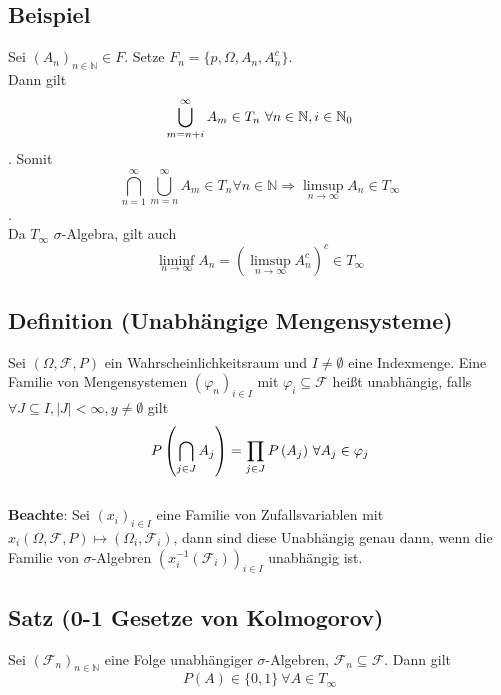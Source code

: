 \documentclass[german,10pt,oneside, fleqn, a4paper]{article}
\newcommand {\N}	{\mathbb{N}}
\newcommand{\brc}[1]{\left(#1\right)}
\newcommand{\mc}[1]{\mathcal{#1}}
\newcommand{\1}[1]{1_{#1}}
\newcommand{\2}[1]{\1{\brac{#1}}}
\newcommand{\raum}{\brc{\Omega,\mc{F},P}}
\newcommand{\f}{\mc{F}}
\begin{document}
\subsection{Beispiel}
Sei $(A_n)_{n\in\N}\in F$. Setze $F_n=\lbrace p,\Omega,A_n,A_n^c\rbrace.$\\
Dann gilt \[\bigcup\limits_{m=n+i}^\infty A_m\in T_n$ $\forall n\in\N, i\in\N_0\].
Somit \[\bigcap\limits_{n=1}^\infty\bigcup\limits_{m=n}^\infty A_m \in T_n \forall n \in \N \Rightarrow\limsup\limits_{n\rightarrow\infty}A_n\in T_\infty\].\\
Da $T_\infty$ $\sigma$-Algebra, gilt auch\\
\[\liminf\limits_{n\rightarrow\infty}A_n=\left(\limsup\limits_{n\rightarrow\infty}A_n^c\right)^c\in T_\infty\]

\subsection{Definition (Unabhängige Mengensysteme)}
Sei $\raum$ ein Wahrscheinlichkeitsraum und $I\neq\emptyset$ eine Indexmenge. Eine Familie von Mengensystemen $\left(\varphi_n\right)_{i\in I}$ mit $\varphi_i \subseteq\f$  heißt unabhängig, falls $\forall J\subseteq I, \vert J \vert < \infty, y\neq\emptyset$ gilt \\
\[P\left(\bigcap\limits_{j\in J}A_j\right)=\prod\limits_{j\in J}P\left(A_j\right)$ $\forall A_j \in\varphi_j\]\\
 \textbf{Beachte}: Sei $\left( x_i \right)_{i\in I}$ eine Familie von Zufallsvariablen mit $x_i\raum\mapsto\left(\Omega_i,\f_i \right)$, dann sind diese Unabhängig genau dann, wenn die Familie von $\sigma$-Algebren $\left(x_i^{-1}\left(\f_i\right)\right)_{i\in I}$ unabhängig ist.

\subsection{Satz (0-1 Gesetze von Kolmogorov)}
Sei $\left(\f_n\right)_{n\in\N}$ eine Folge unabhängiger $\sigma$-Algebren, $\f_n\subseteq\f$. Dann gilt\\
\[P\left(A\right)\in \lbrace 0,1\rbrace\ \forall A \in T_\infty\] \\
\end{document}

